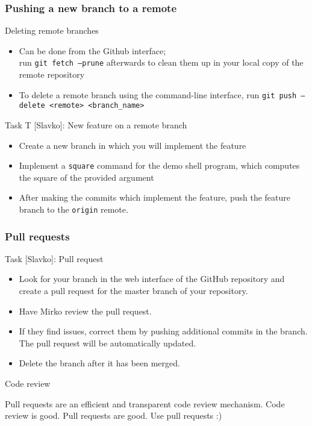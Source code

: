 
\begin{frame}[fragile]

\frametitle{Pushing a new branch to a remote}

\begin{block}{Deleting remote branches}
	\begin{itemize}
	\item Can be done from the Github interface;
	\\ run \texttt{git fetch --prune} afterwards to clean them up in your local copy of the remote repository
	\item To delete a remote branch using the command-line interface, run \texttt{git push --delete <remote> <branch\_name>}
	\end{itemize}
\end{block}	

\begin{block}{Task T [Slavko]: New feature on a remote branch}
	\begin{itemize}
	\item Create a new branch in which you will implement the feature
	\item Implement a \texttt{square} command for the demo shell program, which computes the square of the provided argument
 	\item After making the commits which implement the feature, push the feature branch to the \texttt{origin} remote.
	\end{itemize}
\end{block}	
\end{frame}


\begin{frame}[fragile]
	
\frametitle{Pull requests}

\begin{block}{Task [Slavko]: Pull request}
	\begin{itemize}
	\item Look for your branch in the web interface of the GitHub repository and create a pull request for the master branch of your repository. 
	\item Have Mirko review the pull request. 
	\item If they find issues, correct them by pushing additional commits in the branch. The pull request will be automatically updated.
	\item Delete the branch after it has been merged.
	\end{itemize}	
	
\end{block}	

\begin{block}{Code review}

Pull requests are an efficient and transparent code review mechanism. Code review is good. Pull requests are good. Use pull requests :)
\end{block}

\end{frame}

